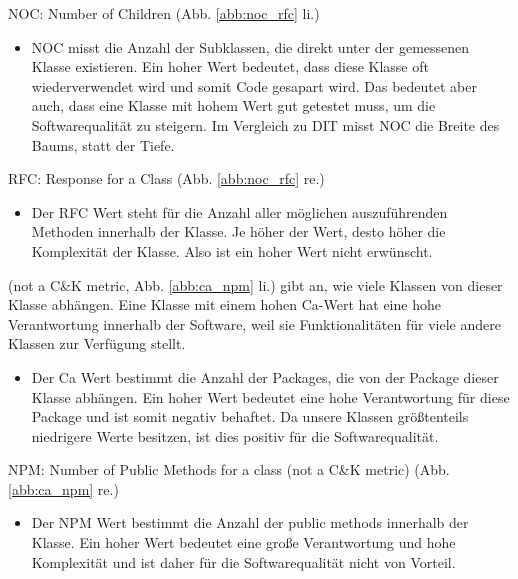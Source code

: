 \documentclass{scrreprt}
\begin{document}
\begin{description}
    
    
    
\item NOC: Number of Children (Abb. \ref{abb:noc_rfc} li.)
    \begin{itemize}
    \item NOC misst die Anzahl der Subklassen, die direkt unter der gemessenen Klasse existieren. Ein hoher Wert bedeutet, dass diese Klasse oft wiederverwendet wird und somit Code gesapart wird. Das bedeutet aber auch, dass eine Klasse mit hohem Wert gut getestet muss, um die Softwarequalität zu steigern. Im Vergleich zu DIT misst NOC die Breite des Baums, statt der Tiefe.
    \end{itemize}

\item RFC: Response for a Class (Abb. \ref{abb:noc_rfc} re.)
    \begin{itemize}
    \item Der RFC Wert steht für die Anzahl aller möglichen auszuführenden Methoden innerhalb der Klasse. Je höher der Wert, desto höher die Komplexität der Klasse. Also ist ein hoher Wert nicht erwünscht.
    \end{itemize}

\item [Ca: Afferent coupling] (not a C\&K metric, Abb. \ref{abb:ca_npm} li.)
    gibt an, wie viele Klassen von dieser Klasse abhängen. Eine Klasse mit einem hohen Ca-Wert hat eine hohe Verantwortung innerhalb der Software, weil sie Funktionalitäten für viele andere Klassen zur Verfügung stellt. 
    \begin{itemize}
    \item Der Ca Wert bestimmt die Anzahl der Packages, die von der Package dieser Klasse abhängen. Ein hoher Wert bedeutet eine hohe Verantwortung für diese Package und ist somit negativ behaftet. Da unsere Klassen größtenteils niedrigere Werte besitzen, ist dies positiv für die Softwarequalität.
    \end{itemize}

\item NPM: Number of Public Methods for a class (not a C\&K metric) (Abb. \ref{abb:ca_npm} re.)
    \begin{itemize}
    \item Der NPM Wert bestimmt die Anzahl der public methods innerhalb der Klasse. Ein hoher Wert bedeutet eine große Verantwortung und hohe Komplexität und ist daher für die Softwarequalität nicht von Vorteil.
    \end{itemize}

\end{description}
\end{document}
